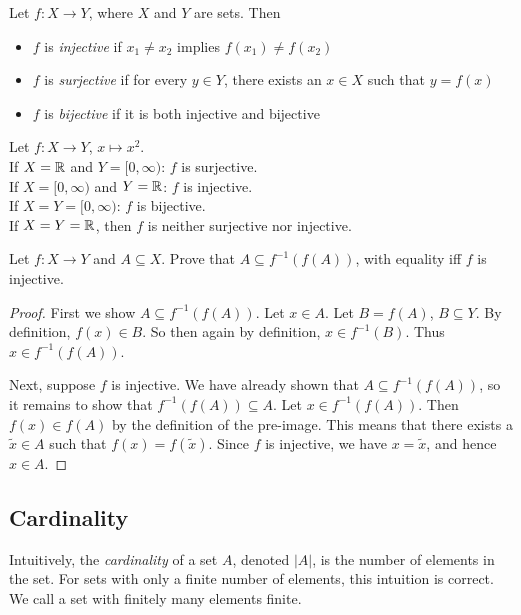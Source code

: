 \documentclass{article}
\begin{document}
\begin{definition}
Let $f:X \to Y$, where $X$ and $Y$ are sets. Then
\begin{itemize}
    \item $f$ is \emph{injective} if $x_1 \neq x_2$ implies $f(x_1) \neq f(x_2)$
    \item $f$ is \emph{surjective} if for every $y \in Y$, there exists an $x \in X$ such that $y = f(x)$
    \item $f$ is \emph{bijective} if it is both injective and bijective
\end{itemize}
\end{definition}

\begin{example}
Let $f:X \to Y$, $ x \mapsto x^2$. \\
If $X = {\mathbb{R}}$ and $Y= [0,\infty)$: $f$ is surjective. \\
If $X = [0,\infty)$ and $Y = {\mathbb{R}}$: $f$ is injective. \\
If $X = Y = [0,\infty)$: $f$ is bijective. \\
If $X=Y={\mathbb{R}}$, then $f$ is neither surjective nor injective.
\end{example}

\begin{proposition}
\label{prop:set_subset_preim_im}
Let $f: X \to Y$ and $A \subseteq X$. Prove that $A \subseteq f^{-1}(f(A))$, with equality iff $f$ is injective. 
\end{proposition}
\begin{proof}
First we show $A \subseteq f^{-1}(f(A))$.
Let $x \in A$. Let $B = f(A)$, $B \subseteq Y$. By definition, $f(x) \in B$. So then again by definition, $x \in f^{-1}(B)$. Thus $x \in f^{-1}(f(A))$.

Next, suppose $f$ is injective. We have already shown that $A \subseteq f^{-1}(f(A))$, so it remains to show that  $f^{-1}(f(A)) \subseteq  A$. Let $x \in f^{-1}(f(A))$. Then $f(x) \in f(A)$ by the definition of the pre-image. This means that there exists a $\tilde x \in A$ such that $f(x) = f(\tilde x)$. Since $f$ is injective, we have $x = \tilde x$, and hence $x \in A$.
\end{proof}


\subsection{Cardinality}

Intuitively, the \emph{cardinality} of a set $A$, denoted $|A|$, is the number of elements in the set. For sets with only a finite number of elements, this intuition is correct. We call a set with finitely many elements finite. 
\end{document}
